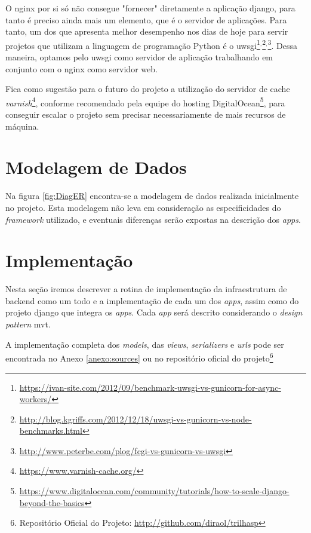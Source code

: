 O \gls{nginx} por si só não consegue "fornecer" diretamente a aplicação django, para tanto é preciso ainda mais um elemento, que é o servidor de aplicações. Para tanto, um dos que apresenta melhor desempenho nos dias de hoje para servir projetos que utilizam a linguagem de programação Python é o \gls{uwsgi}\footnote{\url{https://ivan-site.com/2012/09/benchmark-uwsgi-vs-gunicorn-for-async-workers/}}$^,$\footnote{\url{http://blog.kgriffs.com/2012/12/18/uwsgi-vs-gunicorn-vs-node-benchmarks.html}}$^,$\footnote{\url{http://www.peterbe.com/plog/fcgi-vs-gunicorn-vs-uwsgi}}. Dessa maneira, optamos pelo \gls{uwsgi} como servidor de aplicação trabalhando em conjunto com o \gls{nginx} como servidor web.

Fica como sugestão para o futuro do projeto a utilização do servidor de cache \textit{varnish}\footnote{\url{https://www.varnish-cache.org/}}, conforme recomendado pela equipe do hosting DigitalOcean\footnote{\url{https://www.digitalocean.com/community/tutorials/how-to-scale-django-beyond-the-basics}}, para conseguir escalar o projeto sem precisar necessariamente de mais recursos de máquina.

\section{Modelagem de Dados}\label{sec:diagrama-er}
Na figura \ref{fig:DiagER} encontra-se a modelagem de dados realizada inicialmente no projeto. Esta modelagem não leva em consideração as especificidades do \textit{framework} utilizado, e eventuais diferenças serão expostas na descrição dos \textit{apps}.

\section{Implementação}\label{sec:estrutura-app}
Nesta seção iremos descrever a rotina de implementação da infraestrutura de backend como um todo e a implementação de cada um dos \textit{apps}, assim como do projeto \gls{django} que integra os \textit{apps}. Cada \textit{app} será descrito considerando o \textit{design pattern} \gls{mvt}.

A implementação completa dos \textit{models}, das \textit{views}, \textit{serializers} e \textit{urls} pode ser encontrada no Anexo \ref{anexo:sources} ou no repositório oficial do projeto\footnote{Repositório Oficial do Projeto: \url{http://github.com/diraol/trilhasp}}

